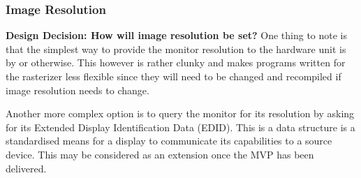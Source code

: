 \subsubsection{Image Resolution}
\textbf{Design Decision: How will image resolution be set?} \newline
One thing to note is that the simplest way to provide the monitor resolution to the hardware unit is by  or otherwise. This however is rather clunky and makes programs written for the rasterizer less flexible since they will need to be changed and recompiled if image resolution needs to change. 

Another more complex option is to query the monitor for its resolution by asking for its Extended Display Identification Data (EDID)\cite{EDIDExplanation}. This is a data structure is a standardised means for a display to communicate its capabilities to a source device. This may be considered as an extension once the MVP has been delivered.

